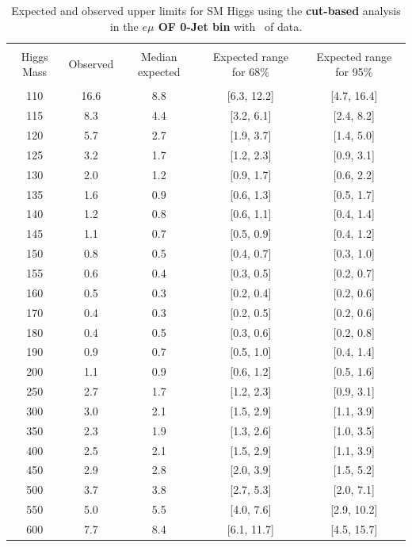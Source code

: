 \begin{table}[hbp!]
\begin{center}
\begin{tabular}{c c c c c}
\hline
\vspace{-3mm} && \\
 Higgs Mass & Observed  & Median expected & Expected range for 68\% & Expected range for 95\%   \\
\vspace{-3mm} && \\
\hline
110 & 16.6 & 8.8 & [6.3, 12.2] & [4.7, 16.4] \\
115 & 8.3 & 4.4 & [3.2, 6.1] & [2.4, 8.2] \\
120 & 5.7 & 2.7 & [1.9, 3.7] & [1.4, 5.0] \\
125 & 3.2 & 1.7 & [1.2, 2.3] & [0.9, 3.1] \\
130 & 2.0 & 1.2 & [0.9, 1.7] & [0.6, 2.2] \\
135 & 1.6 & 0.9 & [0.6, 1.3] & [0.5, 1.7] \\
140 & 1.2 & 0.8 & [0.6, 1.1] & [0.4, 1.4] \\
145 & 1.1 & 0.7 & [0.5, 0.9] & [0.4, 1.2] \\
150 & 0.8 & 0.5 & [0.4, 0.7] & [0.3, 1.0] \\
155 & 0.6 & 0.4 & [0.3, 0.5] & [0.2, 0.7] \\
160 & 0.5 & 0.3 & [0.2, 0.4] & [0.2, 0.6] \\
170 & 0.4 & 0.3 & [0.2, 0.5] & [0.2, 0.6] \\
180 & 0.4 & 0.5 & [0.3, 0.6] & [0.2, 0.8] \\
190 & 0.9 & 0.7 & [0.5, 1.0] & [0.4, 1.4] \\
200 & 1.1 & 0.9 & [0.6, 1.2] & [0.5, 1.6] \\
250 & 2.7 & 1.7 & [1.2, 2.3] & [0.9, 3.1] \\
300 & 3.0 & 2.1 & [1.5, 2.9] & [1.1, 3.9] \\
350 & 2.3 & 1.9 & [1.3, 2.6] & [1.0, 3.5] \\
400 & 2.5 & 2.1 & [1.5, 2.9] & [1.1, 3.9] \\
450 & 2.9 & 2.8 & [2.0, 3.9] & [1.5, 5.2] \\
500 & 3.7 & 3.8 & [2.7, 5.3] & [2.0, 7.1] \\
550 & 5.0 & 5.5 & [4.0, 7.6] & [2.9, 10.2] \\
600 & 7.7 & 8.4 & [6.1, 11.7] & [4.5, 15.7] \\
\hline
\end{tabular}
\caption{Expected and observed upper limits for SM Higgs using the
  {\bf cut-based} analysis in the {\bf $e\mu$ OF 0-Jet bin} with \intlumiEightTeV\ of data.}
\label{tab:cutbase_uls_0jof}
\end{center}
\end{table}



